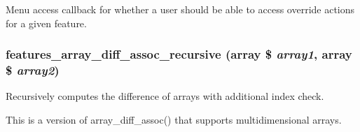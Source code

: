 \label{features_8module_aeb1b6b9ab9beb2e78552c06cc86a241c}
Menu access callback for whether a user should be able to access override actions for a given feature. \hypertarget{features_8module_a5d81c8de392acdca91b2f1f5101f889a}{
\subsubsection[{features\_\-array\_\-diff\_\-assoc\_\-recursive}]{\setlength{\rightskip}{0pt plus 5cm}features\_\-array\_\-diff\_\-assoc\_\-recursive (array \$ {\em array1}, \/  array \$ {\em array2})}}
\label{features_8module_a5d81c8de392acdca91b2f1f5101f889a}
Recursively computes the difference of arrays with additional index check.

This is a version of array\_\-diff\_\-assoc() that supports multidimensional arrays.


